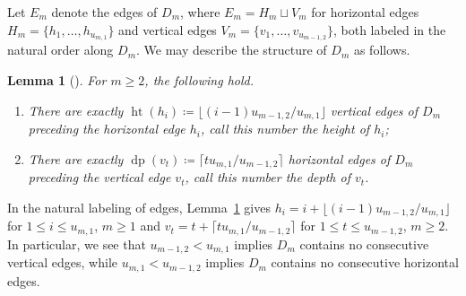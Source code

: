\documentclass[10pt]{amsart}
\newtheorem{lemma}[theorem]{Lemma}
\theoremstyle{definition}
\DeclareMathOperator{\hgt}{ht}
\DeclareMathOperator{\dpt}{dp}
\begin{document}
Let $E_m$ denote the edges of $D_m$, where $E_m=H_m\sqcup V_m$ for horizontal edges $H_m=\{h_1,\ldots,h_{u_{m,1}}\}$ and vertical edges $V_m=\{v_1,\ldots,v_{u_{m-1,2}}\}$, both labeled in the natural order along $D_m$. 
We may describe the structure of $D_m$ as follows.
\begin{lemma}[{\cite[Lemma~3.2]{rupel2}}]
 \label{le:height and depth}
 For $m\ge2$, the following hold.
 \begin{enumerate}[label=(\alph*)]
 \item There are exactly $\hgt(h_i)\coloneqq \lfloor (i-1)u_{m-1,2}/u_{m,1}\rfloor$ vertical edges of $D_m$ preceding the horizontal edge $h_i$, call this number the \emph{height} of $h_i$;
 \item There are exactly $\dpt(v_t)\coloneqq \lceil tu_{m,1}/u_{m-1,2}\rceil$ horizontal edges of $D_m$ preceding the vertical edge $v_t$, call this number the \emph{depth} of $v_t$.
 \end{enumerate}
\end{lemma}
In the natural labeling of edges, Lemma~\ref{le:height and depth} gives $h_i=i+\lfloor (i-1)u_{m-1,2}/u_{m,1}\rfloor$ for $1\le i\le u_{m,1}$, $m\ge1$ and $v_t=t+\lceil tu_{m,1}/u_{m-1,2}\rceil$ for $1\le t\le u_{m-1,2}$, $m\ge2$. 
In particular, we see that $u_{m-1,2}<u_{m,1}$ implies $D_m$ contains no consecutive vertical edges, while $u_{m,1}<u_{m-1,2}$ implies $D_m$ contains no consecutive horizontal edges. 
\end{document}
